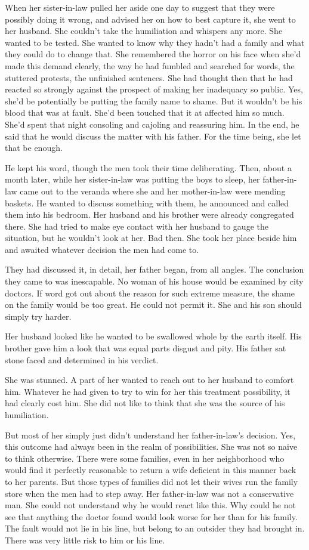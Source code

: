 \documentclass{article}
\newcommand{\egnote}{\todo[color=violet!30]}
\begin{document}
When her sister-in-law pulled her aside one day to suggest that they were possibly doing it wrong, and advised her on how to best capture it, she went to her husband. She couldn't take the humiliation and whispers any more. She wanted to be tested. She wanted to know why they hadn't had a family and what they could do to change that. She remembered the horror on his face when she'd made this demand clearly, the way he had fumbled and searched for words, the stuttered protests, the unfinished sentences. She had thought then that he had reacted so strongly against the prospect of making her inadequacy so public. Yes, she'd be potentially be putting the family name to shame. But it wouldn't be his blood that was at fault. She'd been touched that it at affected him so much. She'd spent that night consoling and cajoling and reassuring him. In the end, he said that he would discuss the matter with his father. For the time being, she let that be enough.

He kept his word, though the men took their time deliberating. Then, about a month later, while her sister-in-law was putting the boys to sleep, her father-in-law came out to the veranda where she and her mother-in-law were mending baskets. He wanted to discuss something with them, he announced and called them into his bedroom. Her husband and his brother were already congregated there. She had tried to make eye contact with her husband to gauge the situation, but he wouldn't look at her. Bad then. She took her place beside him and awaited whatever decision the men had come to. 

They had discussed it, in detail, her father began, from all angles. The conclusion they came to was inescapable. No woman of his house would be examined by city doctors. If word got out about the reason for such extreme measure, the shame on the family would be too great. He could not permit it. She and his son should simply try harder.

Her husband looked like he wanted to be swallowed whole by the earth itself. His brother gave him a look that was equal parts disgust and pity. His father sat stone faced and determined in his verdict. 

She was stunned. A part of her wanted to reach out to her husband to comfort him. Whatever he had given to try to win for her this treatment possibility, it had clearly cost him. She did not like to think that she was the source of his humiliation. 

But most of her simply just didn't understand her father-in-law's decision. Yes, this outcome had always been in the realm of possibilities. She was not so naive to think otherwise. There were some families, even in her neighborhood who would find it perfectly reasonable to return a wife deficient in this manner back to her parents. But those types of families did not let their wives run the family store when the men had to step away. Her father-in-law was not a conservative man. She could not understand why he would react like this. Why could he not see that anything the doctor found would look worse for her than for his family.\egnote{s/./?} The fault would not lie in his line, but belong to an outsider they had brought in. There was very little risk to him or his line.
\end{document}
